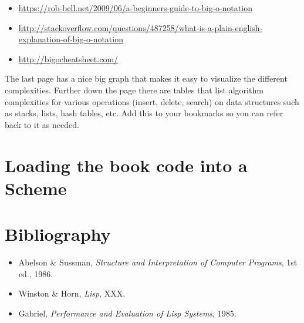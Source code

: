 \documentclass[12pt,openright,draft]{book}
\begin{document}
\begin{itemize}
\item \url{https://rob-bell.net/2009/06/a-beginners-guide-to-big-o-notation}

\item \url{http://stackoverflow.com/questions/487258/what-is-a-plain-english-explanation-of-big-o-notation}

\item \url{http://bigocheatsheet.com/}
\end{itemize}

The last page has a nice big graph that makes it easy to visualize the
different complexities.  Further down the page there are tables that
list algorithm complexities for various operations (insert, delete,
search) on data structures such as stacks, lists, hash tables, etc.
Add this to your bookmarks so you can refer back to it as needed.

\appendix
\chapter{Loading the book code into a Scheme}


\backmatter{}
\chapter{Bibliography}

\begin{itemize}
\item Abelson \& Sussman, \emph{Structure and Interpretation of Computer Programs}, 1st ed., 1986.

\item Winston \& Horn, \emph{Lisp}, XXX.

\item Gabriel, \emph{Performance and Evaluation of Lisp Systems}, 1985.
\end{itemize}
\end{document}
